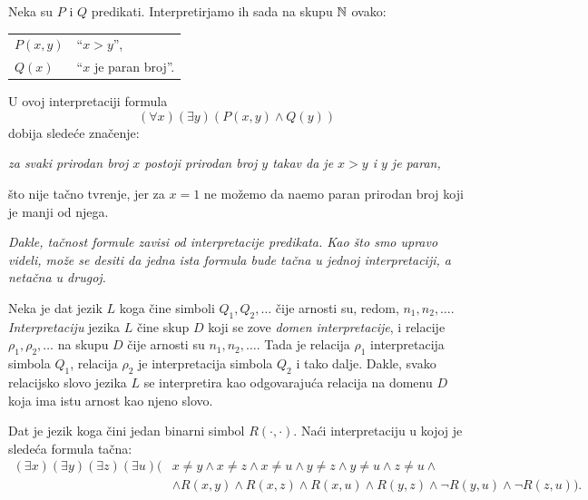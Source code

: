 \begin{EX}
  Neka su $P$ i $Q$ predikati. Interpretirjamo ih sada na skupu $\mathbb{N}$ ovako:

  \medskip

  \begin{tabular}{l@{\quad$\leadsto$\quad}l}
    $P(x, y)$ & \enquote{$x > y$},\\
    $Q(x)$ & \enquote{$x$ je paran broj}.
  \end{tabular}
  
  \medskip
  
  \noindent
  U ovoj interpretaciji formula
  $$
    (\forall x)(\exists y)(P(x, y) \land Q(y))
  $$
  dobija slede\'ce zna\v cenje:
  \begin{center}
    \textit{za svaki prirodan broj $x$ postoji prirodan broj $y$ takav da je $x > y$ i $y$ je paran,}
  \end{center}
  \v sto nije ta\v cno tvr\dj enje, jer za $x = 1$ ne mo\v zemo da na\dj emo paran prirodan broj koji je manji od njega.
\end{EX}

\begin{NAP}\it
  Dakle, ta\v cnost formule zavisi od interpretacije predikata. Kao \v sto smo upravo videli, mo\v ze se desiti da jedna ista formula
  bude ta\v cna u jednoj interpretaciji, a neta\v cna u drugoj.
\end{NAP}

\ifBIOINF\else
    \begin{DEF}
      Neka je dat jezik $L$ koga \v cine simboli $Q_1, Q_2, \ldots$ \v cije arnosti su, redom, $n_1, n_2, \ldots$.
      \emph{Interpretaciju} jezika $L$ \v cine skup $D$ koji se zove \emph{domen interpretacije}, i relacije
      $\rho_1, \rho_2, \ldots$ na skupu $D$ \v cije arnosti su $n_1, n_2, \ldots$. Tada je relacija $\rho_1$
      interpretacija simbola $Q_1$, relacija $\rho_2$ je interpretacija simbola $Q_2$ i tako dalje.
      Dakle, svako relacijsko slovo jezika $L$ se interpretira kao odgovaraju\'ca relacija na domenu $D$ koja
      ima istu arnost kao njeno slovo.
    \end{DEF}
\fi

\begin{EX}
  Dat je jezik koga \v cini jedan binarni simbol $R(\cdot, \cdot)$. Na\'ci interpretaciju u kojoj je slede\'ca
  formula ta\v cna:
  \begin{align*}
    (\exists x)(\exists y)(\exists z)(\exists u)
    (&x \ne y \land x \ne z \land x \ne u \land y \ne z \land y \ne u \land z \ne u \land\\
     &\land R(x, y) \land R(x, z) \land R(x, u) \land R(y, z) \land \lnot R(y, u) \land \lnot R(z, u)).
  \end{align*}
\end{EX}

